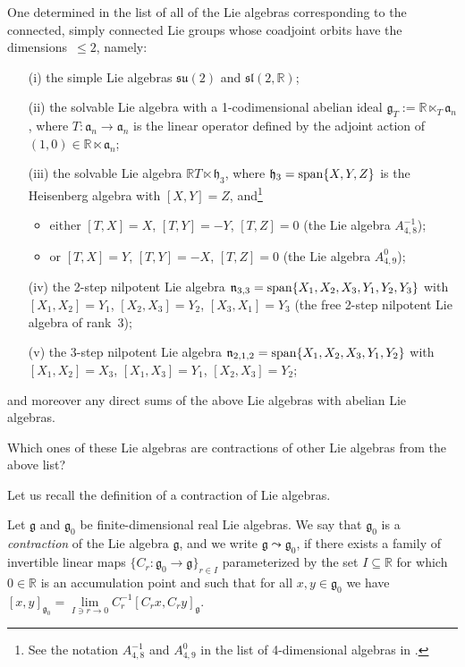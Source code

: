 \documentclass[
reqno]{amsart}
\begin{document}
\begin{problem}\label{probl1}
\normalfont
One determined in \cite{ACL86} the list of all of the Lie algebras corresponding to 
the connected, simply connected Lie groups whose coadjoint orbits have the dimensions~$\le2$, namely: 
\begin{itemize}
\item[(i)] the simple Lie algebras ${{\mathfrak s}{\mathfrak u}}(2)$ and ${{\mathfrak s}{\mathfrak l}}(2,{{\mathbb R}})$; 
\item[(ii)] the solvable Lie algebra with a 1-codimensional abelian ideal ${{\mathfrak g}}_T:={{\mathbb R}}\ltimes_T {{\mathfrak a}}_n$, 
where $T\colon{{\mathfrak a}}_n\to{{\mathfrak a}}_n$ is the linear operator defined by the adjoint action 
of $(1,0)\in{{\mathbb R}}\ltimes{{\mathfrak a}}_n$; 
\item[(iii)] the solvable Lie algebra ${{\mathbb R}} T\ltimes{{\mathfrak h}}_3$, 
where ${{\mathfrak h}}_3={{\rm span}}\{X,Y,Z\}$ is the Heisenberg algebra with $[X,Y]=Z$, 
and\footnote{See the notation $A_{4,8}^{-1}$ and $A_{4,9}^0$ 
in the list of 4-dimensional algebras in \cite[\S VI.B]{NP06}.}
\begin{itemize}
\item either $[T,X]=X$, $[T,Y]=-Y$, $[T,Z]=0$ \hfill(the Lie algebra $A_{4,8}^{-1}$); 
\item or $[T,X]=Y$, $[T,Y]=-X$, $[T,Z]=0$ \hfill(the Lie algebra $A_{4,9}^0$); 
\end{itemize}
\item[(iv)] the 2-step nilpotent Lie algebra  
${{\mathfrak n}}_{3,3}={{\rm span}}\{X_1,X_2,X_3,Y_1,Y_2,Y_3\}$ with $[X_1,X_2]=Y_1$, $[X_2,X_3]=Y_2$, $[X_3,X_1]=Y_3$ 
(the free 2-step nilpotent Lie algebra of rank~3); 
\item[(v)] the 3-step nilpotent Lie algebra ${{\mathfrak n}}_{2,1,2}={{\rm span}}\{X_1,X_2,X_3,Y_1,Y_2\}$ with $[X_1,X_2]=X_3$, $[X_1,X_3]=Y_1$, $[X_2,X_3]=Y_2$;  
\end{itemize}
and moreover any direct sums of the above Lie algebras with abelian Lie algebras. 

Which ones of these Lie algebras are contractions of other Lie algebras from the above list?  
\end{problem}

Let us recall the definition of a contraction of Lie algebras.

\begin{definition}\label{contr0_def}
\normalfont 
Let ${{\mathfrak g}}$ and ${{\mathfrak g}}_0$ be finite-dimensional real Lie algebras. 
We say that ${{\mathfrak g}}_0$ is a \emph{contraction} of the Lie algebra ${{\mathfrak g}}$, and we write ${{\mathfrak g}}{\leadsto}{{\mathfrak g}}_0$, 
if there exists a family of invertible linear maps $\{C_r\colon{{\mathfrak g}}_0\to{{\mathfrak g}}\}_{r\in I}$ parameterized 
by the set $I\subseteq{{\mathbb R}}$ for which $0\in{{\mathbb R}}$ is an accumulation point and such that 
for all $x,y\in{{\mathfrak g}}_0$ we have 
$[x,y]_{{{\mathfrak g}}_0}=\lim\limits_{I\ni r\to 0}C_r^{-1}[C_rx,C_ry]_{{\mathfrak g}}$. 
\end{definition}
\end{document}
